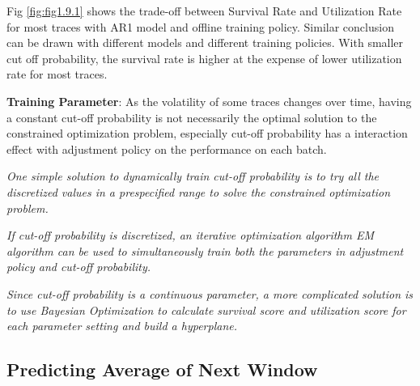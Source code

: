\documentclass{article}
\begin{document}
\begin{flushleft}
Fig \ref{fig:fig1.9.1} shows the trade-off between Survival Rate and Utilization Rate for most traces with AR1 model and offline training policy. Similar conclusion can be drawn with different models and different training policies. With smaller cut off probability, the survival rate is higher at the expense of lower utilization rate for most traces.
\end{flushleft}

\begin{flushleft}
\textbf{Training Parameter}: As the volatility of some traces changes over time, having a constant cut-off probability is not necessarily the optimal solution to the constrained optimization problem, especially cut-off probability has a interaction effect with adjustment policy on the performance on each batch.

\textit{One simple solution to dynamically train cut-off probability is to try all the discretized values in a prespecified range to solve the constrained optimization problem.}

\textit{If cut-off probability is discretized, an iterative optimization algorithm EM algorithm can be used to simultaneously train both the parameters in adjustment policy and cut-off probability. }

\textit{Since cut-off probability is a continuous parameter, a more complicated solution is to use Bayesian Optimization to calculate survival score and utilization score for each parameter setting and build a hyperplane.}
\end{flushleft}

\subsection{Predicting Average of Next Window}
\end{document}
